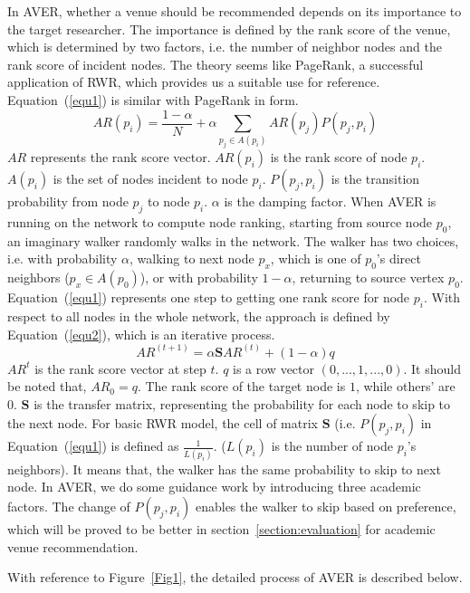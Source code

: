 \documentclass{sig-alternate-2013}
\begin{document}
In AVER, whether a venue should be recommended depends on its importance to the target researcher. The importance is defined by the rank score of the venue, which is determined by two factors, i.e. the number of neighbor nodes and the rank score of incident nodes. The theory seems like PageRank, a successful application of RWR, which provides us a suitable use for reference. Equation~(\ref{equ1}) is similar with PageRank in form.
\begin{equation}
\label{equ1}
AR(p_{i})=\frac{1-\alpha}{N}+\alpha \sum_{p_{j}\in A(p_{i})}AR(p_{j})P(p_{j},p_{i})
\end{equation}
$AR$ represents the rank score vector. $AR(p_{i})$ is the rank score of node $p_{i}$. $A(p_{i})$ is the set of nodes incident to node $p_{i}$. $P(p_{j},p_{i})$ is the transition probability from node $p_{j}$ to node $p_{i}$. $\alpha$ is the damping factor. When AVER is running on the network to compute node ranking, starting from source node $p_{0}$, an imaginary walker randomly walks in the network. The walker has two choices, i.e. with probability $\alpha$, walking to next node $p_{x}$, which is one of $p_{0}$'s direct neighbors ($p_{x}\in A(p_{0})$), or with probability $1-\alpha$, returning to source vertex $p_{0}$. Equation~(\ref{equ1}) represents one step to getting one rank score for node $p_{i}$. With respect to all nodes in the whole network, the approach is defined by Equation~(\ref{equ2}), which is an iterative process.
\begin{equation}
\label{equ2}
AR^{(t+1)}=\alpha \mathbf{S}AR^{(t)}+(1-\alpha)q
\end{equation}
$AR^{t}$ is the rank score vector at step $t$. $q$ is a row vector $(0,...,1,...,0)$. It should be noted that, $AR_{0}=q$. The rank score of the target node is $1$, while others' are $0$. $\mathbf{S}$ is the transfer matrix, representing the probability for each node to skip to the next node. For basic RWR model, the cell of matrix $\mathbf{S}$ (i.e. $P(p_{j},p_{i})$ in Equation~(\ref{equ1}) is defined as $\frac{1}{L(p_{i})}$. ($L(p_{i})$ is the number of node $p_{i}$'s neighbors). It means that, the walker has the same probability to skip to next node. In AVER, we do some guidance work by introducing three academic factors. The change of $P(p_{j},p_{i})$ enables the walker to skip based on preference, which will be proved to be better in section~\ref{section:evaluation} for academic venue recommendation.

With reference to Figure~\ref{Fig1}, the detailed process of AVER is described below.
\end{document}
